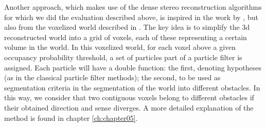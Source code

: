 Another approach, which makes use of the dense stereo reconstruction algorithms for which we did the evaluation described above, is inspired in the work by \cite{danescu2012particle}, but also from the voxelized world described in \cite{broggi2013}. The key idea is to simplify the 3d reconstructed world into a grid of voxels, each of these representing a certain volume in the world. In this voxelized world, for each voxel above a given occupancy probability threshold, a set of particles part of a particle filter is assigned. Each particle will have a double function: the first, denoting hypotheses (as in the classical particle filter methods); the second, to be used as segmentation criteria in the segmentation of the world into different obstacles. In this way, we consider that two contiguous voxels belong to different obstacles if their obtained direction and sense diverges. A more detailed explanation of the method is found in chapter \ref{ch:chapter05}.

